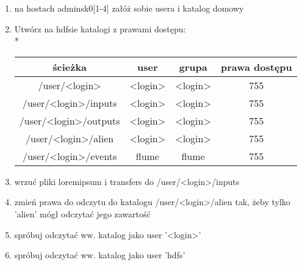 \documentclass[11pt]{article}
\begin{document}
\begin{enumerate}
\item na hostach adminsk0[1-4] załóż sobie usera i katalog domowy
\item Utwórz na hdfsie katalogi z prawami dostępu:\\*

\begin{tabular}{c | c | c | c}
	ścieżka & user & grupa & prawa dostępu \\ \hline 
	/user/<login> & <login> & <login> & 755 \\
	/user/<login>/inputs & <login> & <login> & 755 \\
	/user/<login>/outputs & <login> & <login> & 755 \\
	/user/<login>/alien & <login> & <login> & 755 \\
	/user/<login>/events & flume & flume & 755 \\
\end{tabular}

\item wrzuć pliki loremipsum i transfers do /user/<login>/inputs
\item zmień prawa do odczytu do katalogu /user/<login>/alien tak, żeby tylko 'alien' mógł odczytać jego zawartość
\item spróbuj odczytać ww. katalog jako user ’<login>’
\item spróbuj odczytać ww. katalog jako user ’hdfs’
\end{enumerate}
\end{document}
